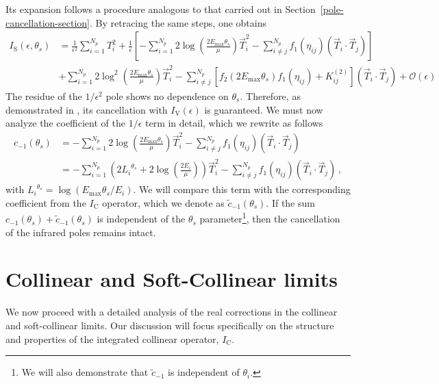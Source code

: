 \documentclass[a4paper, 12pt]{book}
\begin{document}
Its expansion follows a procedure analogous to that carried out in Section~\ref{pole-cancellation-section}. By retracing the same steps, one obtains
\begin{equation}
  \begin{aligned}
  I_{\mathrm{S}} (\epsilon, \theta_s) &= \frac{1}{\epsilon^2} \sum_{i=1}^{N_p} T_i^2 + \frac{1}{\epsilon}\left[-\sum_{i=1}^{N_p} 2 \log{\left(\frac{2 E_{\mathrm{max}}\theta_s}{\mu} \right)} \vec{T}_i^2 - \sum_{i\neq j}^{N_p} f_1(\eta_{ij}) (\vec{T}_i \cdot \vec{T}_j) \right]  \\
  &  + \sum_{i=1}^{N_p} 2 \log^2{\left(\frac{2 E_{\mathrm{max}}\theta_s}{\mu} \right)}\vec{T}_i^2 - \sum_{i\neq j}^{N_p} \left[ f_2 \left(2 E_{\mathrm{max}}\theta_s\right) f_1(\eta_{ij}) + K_{ij}^{(2)}\right] (\vec{T}_i \cdot \vec{T}_j) + \mathcal{O}(\epsilon)
  \end{aligned}
  \label{pink}
\end{equation}
The residue of the $1/\epsilon^2$ pole shows no dependence on $\theta_s$. Therefore, as demonstrated in \cite{Devoto:2023rpv}, its cancellation with $I_{\mathrm{V}}(\epsilon)$ is guaranteed. We must now analyze the coefficient of the $1/\epsilon$ term in detail, which we rewrite as follows
\begin{equation}
  \begin{aligned}
  c_{-1}(\theta_s) & = -\sum_{i=1}^{N_p} 2 \log{\left(\frac{2 E_{\mathrm{max}}\theta_s}{\mu} \right)} \vec{T}_i^2 - \sum_{i\neq j}^{N_p} f_1(\eta_{ij}) (\vec{T}_i \cdot \vec{T}_j)  \\
  & = -\sum_{i=1}^{N_p} \left( 2{L_i}^{\theta_s} + 2 \log{\left(\frac{2 E_i}{\mu} \right) } \right) \vec{T}_i^2 - \sum_{i\neq j}^{N_p} f_1(\eta_{ij}) (\vec{T}_i \cdot \vec{T}_j) \, ,
  \label{coefficient-soft}
  \end{aligned}
\end{equation}
with ${L_i}^{\theta_s}=\log{\left(E_{\mathrm{max}}\theta_s/E_i\right)}$. We will compare this term with the corresponding coefficient from the $I_{\mathrm{C}}$ operator, which we denote as $\tilde{c}_{-1}(\theta_s)$. If the sum $c_{-1}(\theta_s) + \tilde{c}_{-1}(\theta_s)$ is independent of the $\theta_s$ parameter\footnote{We will also demonstrate that $\tilde{c}_{-1}$ is independent of $\theta_i$.}, then the cancellation of the infrared poles remains intact.

\section{Collinear and Soft-Collinear limits}
We now proceed with a detailed analysis of the real corrections in the collinear and soft-collinear limits. Our discussion will focus specifically on the structure and properties of the integrated collinear operator, $I_{\mathrm{C}}$.
\end{document}
